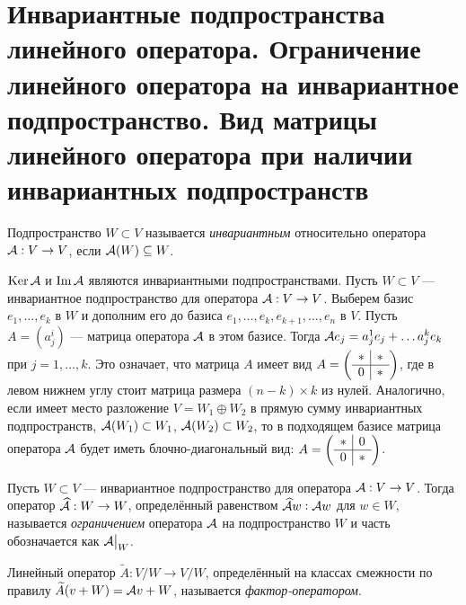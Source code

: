 \section{Инвариантные подпространства линейного оператора. Ограничение линейного оператора на инвариантное подпространство. Вид матрицы линейного оператора при наличии инвариантных подпространств}

\begin{definition}
    Подпространство $W \subset V$ называется \textit{инвариантным} относительно оператора $\mathcal{A}: V \to V$, если $\mathcal{A}(W) \subseteq W$.
\end{definition}

\begin{example}
    $\operatorname{Ker}\mathcal{A}$ и $\operatorname{Im}\mathcal{A}$ являются инвариантными подпространствами. Пусть $W \subset V$ --- инвариантное подпространство для оператора $\mathcal{A}: V \to V$. Выберем базис $e_1, \ldots, e_k$ в $W$ и дополним его до базиса $e_1, \ldots, e_k, e_{k + 1}, \ldots, e_n$ в $V$. Пусть $A = (a^i_j)$ --- матрица оператора $\mathcal{A}$ в этом базисе. Тогда $\mathcal{A} e_j = a^1_je_j + \ldots a^k_je_k$ при $j = 1, \ldots, k$. Это означает, что матрица $A$ имеет вид
    $
    A =
    \left(\begin{array}{c | c}
        \ast & \ast\\
        \hline
        0 & \ast
    \end{array}
    \right)
    $, где в левом нижнем углу стоит матрица размера $(n - k) \times k$ из нулей. Аналогично, если имеет место разложение $V = W_1 \oplus W_2$ в прямую сумму инвариантных подпространств, $\mathcal{A}(W_1) \subset W_1$, $\mathcal{A}(W_2) \subset W_2$, то в подходящем базисе матрица оператора $\mathcal{A}$ будет иметь блочно-диагональный вид:
    $
    A =
    \left(\begin{array}{c | c}
        \ast & 0\\
        \hline
        0 & \ast
    \end{array}
    \right)
    $.
\end{example}

\begin{definition}
    Пусть $W \subset V$ --- инвариантное подпространство для оператора $\mathcal{A}: V \to V$. Тогда оператор $\widehat{\mathcal{A}}: W \to W$, определённый равенством $\widehat{\mathcal{A}}w \vcentcolon \mathcal{A} w$ для $w \in W$, называется \textit{ограничением} оператора $\mathcal{A}$ на подпространство $W$ и часть обозначается как $\mathcal{A}\big|_W$.
\end{definition}

\begin{definition}
    Линейный оператор $\widetilde{A}: V / W \to V / W$, определённый на классах смежности по правилу $\widetilde{A}(v + W) = \mathcal{A} v + W$, называется \textit{фактор-оператором}.
\end{definition}

